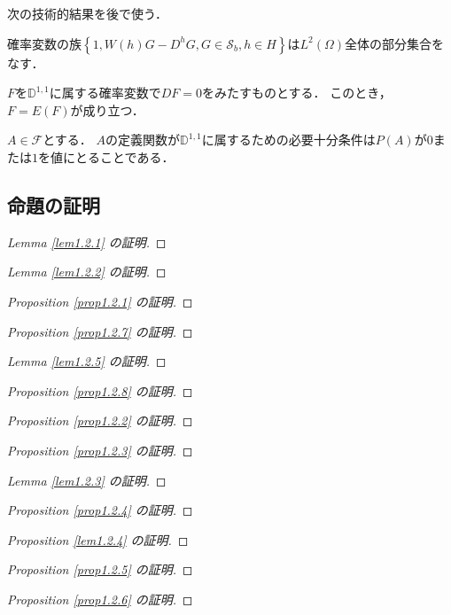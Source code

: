 次の技術的結果を後で使う．
\begin{lemma}\label{lem1.2.4}%
確率変数の族$\left\{1,W(h)G-D^hG,G\in\mathcal{S}_b,h\in H\right\}$は$L^2(\Omega)$全体の部分集合をなす．
\end{lemma}

\begin{proposition}\label{prop1.2.5}%
$F$を$\mathbb{D}^{1,1}$に属する確率変数で$DF=0$をみたすものとする．
このとき，$F=E(F)$が成り立つ．
\end{proposition}

\begin{proposition}\label{prop1.2.6}%
$A\in\mathcal{F}$とする．
$A$の定義関数が$\mathbb{D}^{1,1}$に属するための必要十分条件は$P(A)$が$0$または$1$を値にとることである．
\end{proposition}

\subsection{命題の証明}
\begin{proof}[Lemma \ref{lem1.2.1} の証明]
\end{proof}
\begin{proof}[Lemma \ref{lem1.2.2} の証明]
\end{proof}
\begin{proof}[Proposition \ref{prop1.2.1} の証明]
\end{proof}
\begin{proof}[Proposition \ref{prop1.2.7} の証明]
\end{proof}
\begin{proof}[Lemma \ref{lem1.2.5} の証明]
\end{proof}
\begin{proof}[Proposition \ref{prop1.2.8} の証明]
\end{proof}
\begin{proof}[Proposition \ref{prop1.2.2} の証明]
\end{proof}
\begin{proof}[Proposition \ref{prop1.2.3} の証明]
\end{proof}
\begin{proof}[Lemma \ref{lem1.2.3} の証明]
\end{proof}
\begin{proof}[Proposition \ref{prop1.2.4} の証明]
\end{proof}
\begin{proof}[Proposition \ref{lem1.2.4} の証明]
\end{proof}
\begin{proof}[Proposition \ref{prop1.2.5} の証明]
\end{proof}
\begin{proof}[Proposition \ref{prop1.2.6} の証明]
\end{proof}

